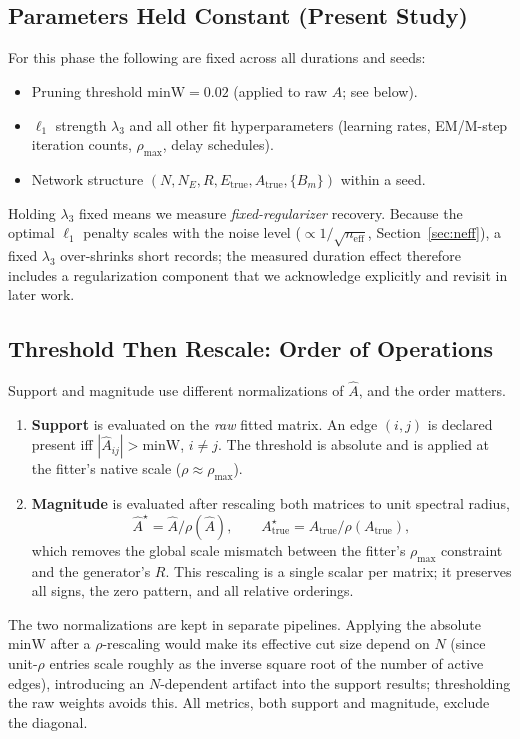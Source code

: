 \documentclass[11pt]{article}
\newcommand{\Atrue}{A_{\mathrm{true}}}
\newcommand{\Ahat}{\hat{A}}
\newcommand{\Etrue}{E_{\mathrm{true}}}
\newcommand{\minW}{\mathrm{minW}}
\newcommand{\neff}{n_{\mathrm{eff}}}
\begin{document}
\subsection{Parameters Held Constant (Present Study)}
For this phase the following are fixed across all durations and seeds:
\begin{itemize}[nosep]
  \item Pruning threshold $\minW = 0.02$ (applied to raw $\Ahat$; see below).
  \item $\ell_1$ strength $\lambda_3$ and all other fit hyperparameters
        (learning rates, EM/M-step iteration counts, $\rho_{\max}$, delay
        schedules).
  \item Network structure $(N, N_E, R, \Etrue, \Atrue, \{B_m\})$ within a seed.
\end{itemize}
Holding $\lambda_3$ fixed means we measure \emph{fixed-regularizer} recovery.
Because the optimal $\ell_1$ penalty scales with the noise level
($\propto 1/\sqrt{\neff}$, Section~\ref{sec:neff}), a fixed $\lambda_3$
over-shrinks short records; the measured duration effect therefore includes a
regularization component that we acknowledge explicitly and revisit in later
work.

\subsection{Threshold Then Rescale: Order of Operations}
\label{sec:order}
Support and magnitude use different normalizations of $\Ahat$, and the order
matters.
\begin{enumerate}[nosep]
  \item \textbf{Support} is evaluated on the \emph{raw} fitted matrix. An edge
        $(i,j)$ is declared present iff $|\Ahat_{ij}| > \minW$, $i\neq j$. The
        threshold is absolute and is applied at the fitter's native scale
        ($\rho \approx \rho_{\max}$).
  \item \textbf{Magnitude} is evaluated after rescaling both matrices to unit
        spectral radius,
        \begin{equation}
          \Ahat^{\star} = \Ahat / \rho(\Ahat),\qquad
          \Atrue^{\star} = \Atrue / \rho(\Atrue),
        \end{equation}
        which removes the global scale mismatch between the fitter's
        $\rho_{\max}$ constraint and the generator's $R$. This rescaling is a
        single scalar per matrix; it preserves all signs, the zero pattern, and
        all relative orderings.
\end{enumerate}
The two normalizations are kept in separate pipelines. Applying the absolute
$\minW$ after a $\rho$-rescaling would make its effective cut size depend on
$N$ (since unit-$\rho$ entries scale roughly as the inverse square root of the
number of active edges), introducing an $N$-dependent artifact into the support
results; thresholding the raw weights avoids this. All metrics, both support
and magnitude, exclude the diagonal.
\end{document}
